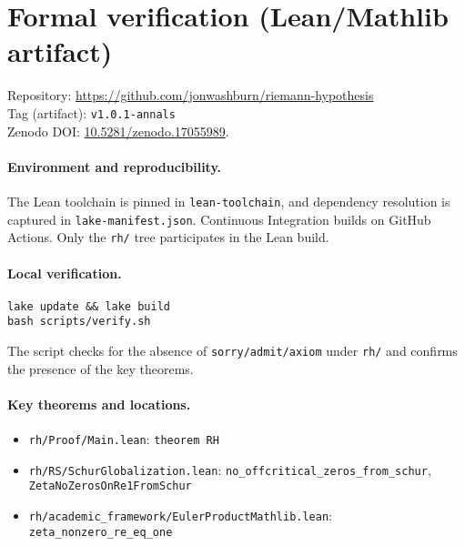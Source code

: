 \documentclass[11pt]{article}
\theoremstyle{definition}
\theoremstyle{remark}
\begin{document}
\section*{Formal verification (Lean/Mathlib artifact)}
\noindent Repository: \url{https://github.com/jonwashburn/riemann-hypothesis}\\
Tag (artifact): \texttt{v1.0.1-annals}\\
Zenodo DOI: \href{https://doi.org/10.5281/zenodo.17055989}{10.5281/zenodo.17055989}.

\paragraph{Environment and reproducibility.}
The Lean toolchain is pinned in \texttt{lean-toolchain}, and dependency resolution is captured in \texttt{lake-manifest.json}. Continuous Integration builds on GitHub Actions. Only the \texttt{rh/} tree participates in the Lean build.

\paragraph{Local verification.}
\begin{verbatim}
lake update && lake build
bash scripts/verify.sh
\end{verbatim}
The script checks for the absence of \texttt{sorry/admit/axiom} under \texttt{rh/} and confirms the presence of the key theorems.

\paragraph{Key theorems and locations.}
\begin{itemize}
\item \texttt{rh/Proof/Main.lean}: \texttt{theorem RH}
\item \texttt{rh/RS/SchurGlobalization.lean}: \texttt{no\_offcritical\_zeros\_from\_schur}, \texttt{ZetaNoZerosOnRe1FromSchur}
\item \texttt{rh/academic\_framework/EulerProductMathlib.lean}: \texttt{zeta\_nonzero\_re\_eq\_one}
\end{itemize}
\end{document}
